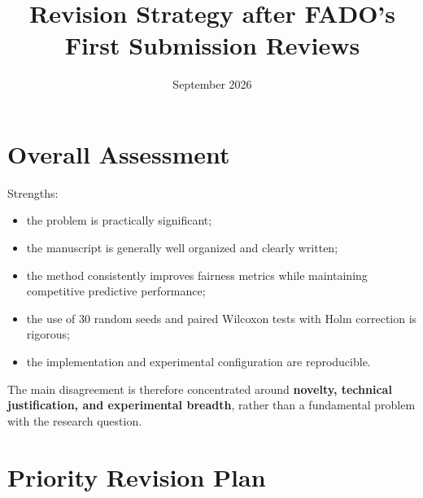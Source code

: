 \documentclass[11pt,a4paper]{article}
\title{\textbf{Revision Strategy after FADO's First Submission Reviews}}
\author{}
\date{September 2026}
\begin{document}
\maketitle

\section{Overall Assessment}

Strengths:
\begin{itemize}[leftmargin=*]
  \item the problem is practically significant;
  \item the manuscript is generally well organized and clearly written;
  \item the method consistently improves fairness metrics while
    maintaining competitive predictive performance;
  \item the use of 30 random seeds and paired Wilcoxon tests with
    Holm correction is rigorous;
  \item the implementation and experimental configuration are reproducible.
\end{itemize}

The main disagreement is therefore concentrated around
\textbf{novelty, technical justification, and experimental breadth},
rather than a fundamental problem with the research question.

\section{Priority Revision Plan}
\end{document}
